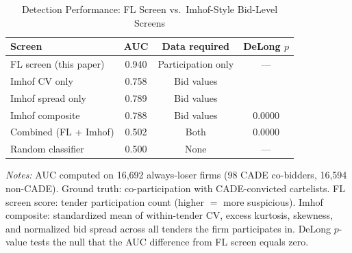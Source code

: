 \begin{table}[htbp]
\centering
\caption{Detection Performance: FL Screen vs.\ Imhof-Style Bid-Level Screens}
\label{tab:imhof_comparison}
\begin{threeparttable}
\small
\begin{tabular}{lccc}
\toprule
Screen & AUC & Data required & DeLong $p$ \\
\midrule
FL screen (this paper) & 0.940 & Participation only & --- \\
Imhof CV only & 0.758 & Bid values & \\
Imhof spread only & 0.789 & Bid values & \\
Imhof composite & 0.788 & Bid values & 0.0000 \\
Combined (FL + Imhof) & 0.502 & Both & 0.0000 \\
Random classifier & 0.500 & None & --- \\
\bottomrule
\end{tabular}
\begin{tablenotes}
\small
\item \textit{Notes:} AUC computed on 16,692 always-loser firms
(98 CADE co-bidders, 16,594 non-CADE).
Ground truth: co-participation with CADE-convicted cartelists.
FL screen score: tender participation count (higher $=$ more suspicious).
Imhof composite: standardized mean of within-tender CV, excess kurtosis,
skewness, and normalized bid spread across all tenders the firm participates in.
DeLong $p$-value tests the null that the AUC difference from FL screen equals zero.
\end{tablenotes}
\end{threeparttable}
\end{table}
